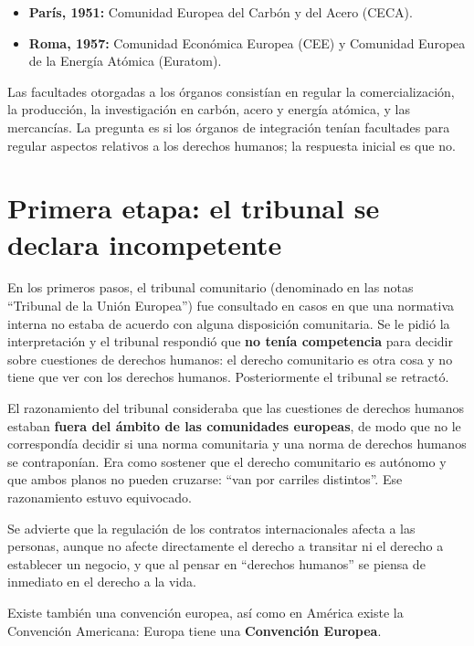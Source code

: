 \documentclass[12pt,oneside]{book}
\begin{document}
\begin{itemize}
    \item \textbf{París, 1951:} Comunidad Europea del Carbón y del Acero (CECA).
    \item \textbf{Roma, 1957:} Comunidad Económica Europea (CEE) y Comunidad Europea de la Energía Atómica (Euratom).
\end{itemize}

Las facultades otorgadas a los órganos consistían en regular la comercialización, la producción, la investigación en carbón, acero y energía atómica, y las mercancías. La pregunta es si los órganos de integración tenían facultades para regular aspectos relativos a los derechos humanos; la respuesta inicial es que no.

\section{Primera etapa: el tribunal se declara incompetente}

En los primeros pasos, el tribunal comunitario (denominado en las notas ``Tribunal de la Unión Europea'') fue consultado en casos en que una normativa interna no estaba de acuerdo con alguna disposición comunitaria. Se le pidió la interpretación y el tribunal respondió que \textbf{no tenía competencia} para decidir sobre cuestiones de derechos humanos: el derecho comunitario es otra cosa y no tiene que ver con los derechos humanos. Posteriormente el tribunal se retractó.

El razonamiento del tribunal consideraba que las cuestiones de derechos humanos estaban \textbf{fuera del ámbito de las comunidades europeas}, de modo que no le correspondía decidir si una norma comunitaria y una norma de derechos humanos se contraponían. Era como sostener que el derecho comunitario es autónomo y que ambos planos no pueden cruzarse: ``van por carriles distintos''. Ese razonamiento estuvo equivocado.

Se advierte que la regulación de los contratos internacionales afecta a las personas, aunque no afecte directamente el derecho a transitar ni el derecho a establecer un negocio, y que al pensar en ``derechos humanos'' se piensa de inmediato en el derecho a la vida.

Existe también una convención europea, así como en América existe la Convención Americana: Europa tiene una \textbf{Convención Europea}.
\end{document}
